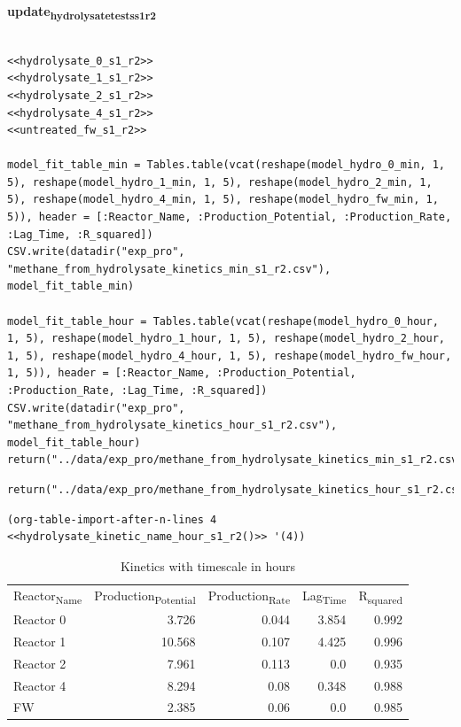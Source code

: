 \documentclass[11pt]{article}
\begin{document}
\textbf{update\textsubscript{hydrolysate}\textsubscript{tests}\textsubscript{s1}\textsubscript{r2}}
\begin{verbatim}

<<hydrolysate_0_s1_r2>>
<<hydrolysate_1_s1_r2>>
<<hydrolysate_2_s1_r2>>
<<hydrolysate_4_s1_r2>>
<<untreated_fw_s1_r2>>

model_fit_table_min = Tables.table(vcat(reshape(model_hydro_0_min, 1, 5), reshape(model_hydro_1_min, 1, 5), reshape(model_hydro_2_min, 1, 5), reshape(model_hydro_4_min, 1, 5), reshape(model_hydro_fw_min, 1, 5)), header = [:Reactor_Name, :Production_Potential, :Production_Rate, :Lag_Time, :R_squared])
CSV.write(datadir("exp_pro", "methane_from_hydrolysate_kinetics_min_s1_r2.csv"), model_fit_table_min)

model_fit_table_hour = Tables.table(vcat(reshape(model_hydro_0_hour, 1, 5), reshape(model_hydro_1_hour, 1, 5), reshape(model_hydro_2_hour, 1, 5), reshape(model_hydro_4_hour, 1, 5), reshape(model_hydro_fw_hour, 1, 5)), header = [:Reactor_Name, :Production_Potential, :Production_Rate, :Lag_Time, :R_squared])
CSV.write(datadir("exp_pro", "methane_from_hydrolysate_kinetics_hour_s1_r2.csv"), model_fit_table_hour)
return("../data/exp_pro/methane_from_hydrolysate_kinetics_min_s1_r2.csv")
\end{verbatim}

\begin{verbatim}
return("../data/exp_pro/methane_from_hydrolysate_kinetics_hour_s1_r2.csv")
\end{verbatim}

\begin{verbatim}
(org-table-import-after-n-lines 4 <<hydrolysate_kinetic_name_hour_s1_r2()>> '(4))
\end{verbatim}

\begin{table}[htbp]
\caption{Kinetics with timescale in hours}
\centering
\begin{tabular}{lrrrr}
Reactor\textsubscript{Name} & Production\textsubscript{Potential} & Production\textsubscript{Rate} & Lag\textsubscript{Time} & R\textsubscript{squared}\\[0pt]
Reactor 0 & 3.726 & 0.044 & 3.854 & 0.992\\[0pt]
Reactor 1 & 10.568 & 0.107 & 4.425 & 0.996\\[0pt]
Reactor 2 & 7.961 & 0.113 & 0.0 & 0.935\\[0pt]
Reactor 4 & 8.294 & 0.08 & 0.348 & 0.988\\[0pt]
FW & 2.385 & 0.06 & 0.0 & 0.985\\[0pt]
\end{tabular}
\end{table}
\end{document}
